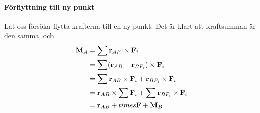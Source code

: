 \paragraph{Förflyttning till ny punkt}
Låt oss försöka flytta krafterna till en ny punkt. Det är klart att kraftsumman är den samma, och
\begin{align*}
	\vect{M}_A &= \sum\vect{r}_{AP_i}\times\vect{F}_i \\
	           &= \sum(\vect{r}_{AB} + \vect{r}_{BP_i})\times\vect{F}_i \\
	           &= \sum\vect{r}_{AB}\times\vect{F}_i + \vect{r}_{BP_i}\times\vect{F}_i \\
	           &= \vect{r}_{AB}\times\sum\vect{F}_i + \sum\vect{r}_{BP_i}\times\vect{F}_i \\
	           &= \vect{r}_{AB}+times\vect{F} + \vect{M}_{B}
\end{align*}